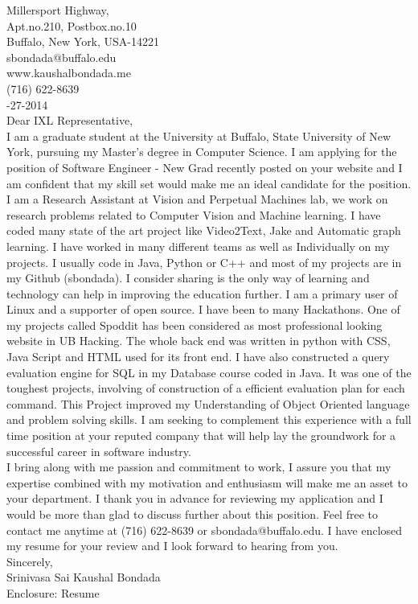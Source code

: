 \documentclass[10pt,letterpaper,oneside]{article}
\begin{document}
 Millersport Highway,\\
Apt.no.210, Postbox.no.10\\
Buffalo, New York, USA-14221\\
sbondada@buffalo.edu\\
www.kaushalbondada.me\\
(716) 622-8639\\

-27-2014\\
 
\noindent Dear IXL Representative,\\
 
I am a graduate student at the University at Buffalo, State University of New York, pursuing my Master's degree in Computer Science. I am applying
for the position of Software Engineer - New Grad recently posted on your website and I am confident that my skill set would make me an ideal candidate for the position.\\

I am a Research Assistant at Vision and Perpetual Machines lab, we work on research problems related to Computer Vision and  Machine
learning. I have coded many state of the art project like Video2Text, Jake and Automatic graph learning. I have worked in many different
teams as well as Individually on my projects. I usually code in Java, Python or C++ and most of my projects are in my Github (sbondada). I consider sharing is the only way of learning and technology can help
in improving the education further. I am a primary user of Linux and a supporter of open source. I have been to many Hackathons. One of my
projects called Spoddit has been considered as most professional looking website in UB Hacking. The whole back end was written in python with
CSS, Java Script and HTML used for its front end. I have also constructed a query evaluation engine for SQL in my Database course coded in Java. It was
one of the toughest projects, involving of construction of a efficient evaluation plan for each command. This Project improved my
Understanding of Object Oriented language and problem solving skills. 
I am seeking to complement this experience with a full time position at your reputed company that will help lay the groundwork for a
successful career in software industry.\\

I bring along with me passion and commitment to work, I assure you that my expertise combined with my motivation and enthusiasm will make me an asset to your department. I thank you in advance for reviewing my application and I would be more than glad to discuss further about this position. Feel free to contact me anytime at (716) 622-8639 or sbondada@buffalo.edu. I have enclosed my resume for your review and I look forward to hearing from you.\\
 
\noindent Sincerely,\\
Srinivasa Sai Kaushal Bondada\\
Enclosure: Resume\\
\end{document}

